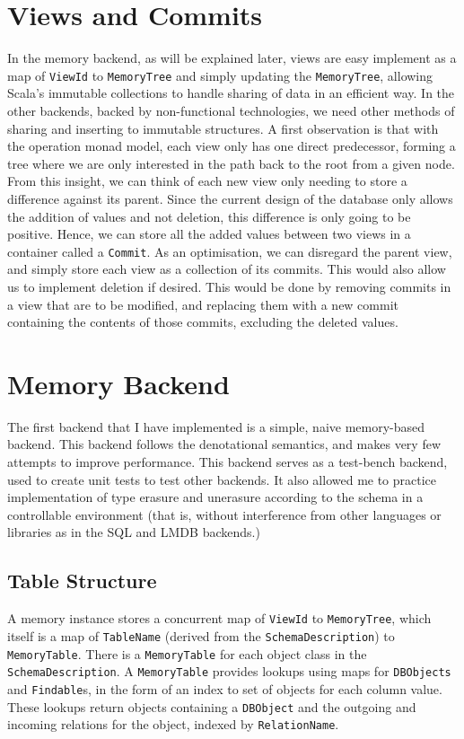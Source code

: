 \documentclass[12pt,a4paper,twoside,openright]{report}
\newcommand\codeName[1]{\texttt{#1}}
\begin{document}
\section{Views and Commits}
In the memory backend, as will be explained later, views are easy implement as a map of \codeName{ViewId} to \codeName{MemoryTree} and simply updating the \codeName{MemoryTree}, allowing Scala's immutable collections to handle sharing of data in an efficient way. In the other backends, backed by non-functional technologies, we need other methods of sharing and inserting to immutable structures. A first observation is that with the operation monad model, each view only has one direct predecessor, forming a tree where we are only interested in the path back to the root from a given node. From this insight, we can think of each new view only needing to store a difference against its parent. Since the current design of the database only allows the addition of values and not deletion, this difference is only going to be positive. Hence, we can store all the added values between two views in a container called a \codeName{Commit}. As an optimisation, we can disregard the parent view, and simply store each view as a collection of its commits. This would also allow us to implement deletion if desired. This would be done by removing commits in a view that are to be modified, and replacing them with a new commit containing the contents of those commits, excluding the deleted values.

\section{Memory Backend}
The first backend that I have implemented is a simple, naive memory-based backend. This backend follows the denotational semantics, and makes very few attempts to improve performance. This backend serves as a test-bench backend, used to create unit tests to test other backends. It also allowed me to practice implementation of type erasure and unerasure according to the schema in a controllable environment (that is, without interference from other languages or libraries as in the SQL and LMDB backends.)
	\subsection{Table Structure}
	A memory instance stores a concurrent map of \codeName{ViewId} to \codeName{MemoryTree}, which itself is a map of \codeName{TableName} (derived from the \codeName{SchemaDescription}) to \codeName{MemoryTable}. There is a \codeName{MemoryTable} for each object class in the \codeName{SchemaDescription}. A \codeName{MemoryTable} provides lookups using maps for \codeName{DBObjects} and \codeName{Findable}s, in the form of an index to set of objects for each column value. These lookups return objects containing a \codeName{DBObject} and the outgoing and incoming relations for the object, indexed by \codeName{RelationName}. 
\end{document}

